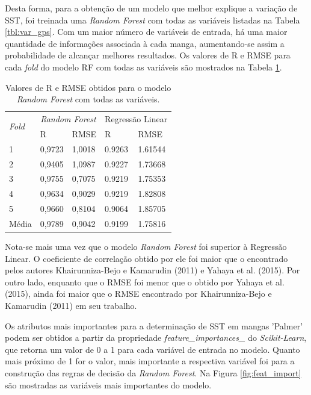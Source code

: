 Desta forma, para a obtenção de um modelo que melhor explique a variação de SST, foi treinada uma \textit{Random Forest} com todas as variáveis listadas na Tabela \ref{tbl:var_gps}. Com um maior número de variáveis de entrada, há uma maior quantidade de informações associada à cada manga, aumentando-se assim a probabilidade de alcançar melhores resultados. Os valores de R e RMSE para cada \textit{fold} do modelo RF com todas as variáveis são mostrados na Tabela \ref{tbl:r_rmse_all}.

\begin{table}[H]
	\centering
	\caption{\label{tbl:r_rmse_all} Valores de R e RMSE obtidos para o modelo \textit{Random Forest} com todas as variáveis.}
	\begin{tabular}{lllll}
	\hline
	\multirow{2}{*}{\textit{Fold}} & \multicolumn{2}{c}{\textit{Random Forest}} & \multicolumn{2}{c}{Regressão Linear} \\ \cline{2-5}
	  	  & R      & RMSE    & R 	& RMSE\\ \hline
	1     & 0,9723 & 1,0018 & 0.9263 & 1.61544 \\ \hline
	2     & 0,9405 & 1,0987 & 0.9227 & 1.73668 \\ \hline
	3     & 0,9755 & 0,7075 & 0.9219 & 1.75353 \\ \hline
	4     & 0,9634 & 0,9029 & 0.9219 & 1.82808 \\ \hline
	5     & 0,9660 & 0,8104 & 0.9064 & 1.85705 \\ \hline
	Média & 0,9789 & 0,9042	& 0.9199 & 1.75816 \\ \hline
	\end{tabular}
\end{table}

Nota-se mais uma vez que o modelo \textit{Random Forest} foi superior à Regressão Linear. O coeficiente de correlação obtido por ele foi maior que o encontrado pelos autores Khairunniza-Bejo e Kamarudin (2011) e Yahaya et al. (2015). Por outro lado, enquanto que o RMSE foi menor que o obtido por Yahaya et al. (2015), ainda foi maior que o RMSE encontrado por Khairunniza-Bejo e Kamarudin (2011) em seu trabalho.

Os atributos mais importantes para a determinação de SST em mangas 'Palmer' podem ser obtidos a partir da propriedade \textit{feature\_importances\_} do \textit{Scikit-Learn}, que retorna um valor de 0 a 1 para cada variável de entrada no modelo. Quanto mais próximo de 1 for o valor, mais importante a respectiva variável foi para a construção das regras de decisão da \textit{Random Forest}. Na Figura \ref{fig:feat_import} são mostradas as variáveis mais importantes do modelo.

